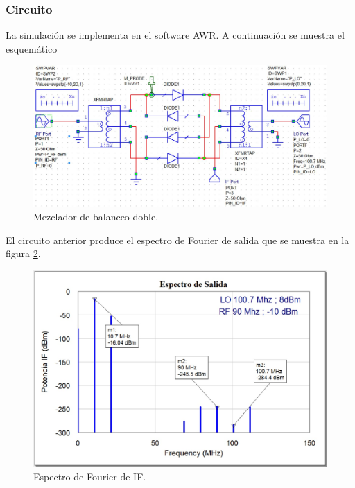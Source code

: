\documentclass[twocolumn]{article}
\begin{document}
\subsubsection{Circuito}
La simulación se implementa en el software AWR. A continuación se muestra el esquemático
\begin{figure}[h]
  \centering    
	\includegraphics[width=\columnwidth]{imagenes/circuito3.jpg}
	\caption{Mezclador de balanceo doble.}\label{fig:circuito3}
\end{figure}

El circuito anterior produce el espectro de Fourier de salida que se muestra en la figura \textcolor{blue}{\ref{fig:IF3}}.
\begin{figure}[h]
  \centering    
	\includegraphics[scale=0.3]{imagenes/IF3.jpg}
	\caption{Espectro de Fourier de IF.}\label{fig:IF3}
\end{figure}
%
\end{document}
